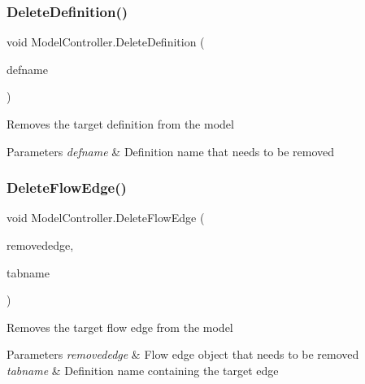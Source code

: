 \subsubsection{\texorpdfstring{Delete\+Definition()}{DeleteDefinition()}}
{\footnotesize\ttfamily void Model\+Controller.\+Delete\+Definition (\begin{DoxyParamCaption}\item[{string}]{defname }\end{DoxyParamCaption})}



Removes the target definition from the model 


\begin{DoxyParams}{Parameters}
{\em defname} & Definition name that needs to be removed\\
\hline
\end{DoxyParams}
\mbox{\label{class_model_controller_af810eecc43d27f5790958b9900ff1215}} 
\subsubsection{\texorpdfstring{Delete\+Flow\+Edge()}{DeleteFlowEdge()}}
{\footnotesize\ttfamily void Model\+Controller.\+Delete\+Flow\+Edge (\begin{DoxyParamCaption}\item[{M\+M.\+Model.\+Flow\+Edge}]{removededge,  }\item[{string}]{tabname }\end{DoxyParamCaption})}



Removes the target flow edge from the model 


\begin{DoxyParams}{Parameters}
{\em removededge} & Flow edge object that needs to be removed\\
\hline
{\em tabname} & Definition name containing the target edge\\
\hline
\end{DoxyParams}
\mbox{\label{class_model_controller_ad9f66266f49a332182e57d2368801e5f}} 
